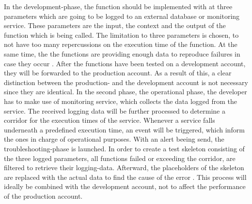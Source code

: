 \documentclass[11pt]{article}
\begin{document}
In the development-phase, the function should be implemented with at three parameters which are going to be logged to an external database or monitoring service. These parameters are the input, the context and the output of the function which is being called. The limitation to three parameters is chosen, to not have too many repercussions on the execution time of the function. At the same time, the the functions are providing enough data to reproduce failures in case they occur \cite{manner2019troubleshooting}. After the functions have been tested on a development account, they will be forwarded to the production account. As a result of this, a clear distinction between the production- and the development account is not necessary since they are identical. In the second phase, the operational phase, the developer has to make use of monitoring service, which collects the data logged from the service. The received logging data will be further processed to determine a corridor for the execution times of the service. Whenever a service falls underneath a predefined execution time, an event will be triggered, which inform the ones in charge of operational purposes. With an alert beeing send, the troubleshooting-phase is launched. In order to create a test skeleton consisting of the three logged parameters, all functions failed or exceeding the corridor, are filtered to retrieve their logging-data. Afterward, the placeholders of the skeleton are replaced with the actual data to find the cause of the error \cite{manner2019troubleshooting}.  This process will ideally be combined with the development account, not to affect the performance of the production account. \\\\
\end{document}
